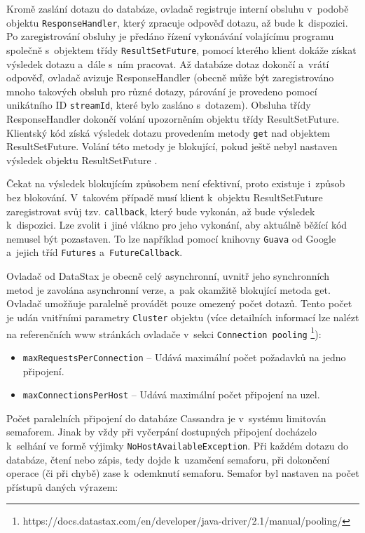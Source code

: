 \noindent Kromě zaslání dotazu do databáze, ovladač registruje interní obsluhu v~podobě objektu \texttt{ResponseHandler}, který zpracuje odpověď dotazu, až bude k~dispozici. Po zaregistrování obsluhy je předáno řízení vykonávání volajícímu programu společně s~objektem třídy \texttt{ResultSetFuture}, pomocí kterého klient dokáže získat výsledek dotazu a~dále s~ním pracovat.
Až databáze dotaz dokončí a~vrátí odpověď, ovladač avizuje ResponseHandler (obecně může být zaregistrováno mnoho takových obsluh pro různé dotazy, párování je provedeno pomocí unikátního ID \texttt{streamId}, které bylo zasláno s~dotazem). Obsluha třídy ResponseHandler dokončí volání upozorněním objektu třídy ResultSetFuture.
Klientský kód získá výsledek dotazu provedením metody \texttt{get} nad objektem ResultSetFuture. Volání této metody je blokující, pokud ještě nebyl nastaven výsledek objektu ResultSetFuture \cite{asyncQueriesCassandra}.

Čekat na výsledek blokujícím způsobem není efektivní, proto existuje i~způsob bez blokování. V~takovém případě musí klient k~objektu ResultSetFuture zaregistrovat svůj tzv. \texttt{callback}, který bude vykonán, až bude výsledek k~dispozici.
Lze zvolit i~jiné vlákno pro jeho vykonání, aby aktuálně běžící kód nemusel být pozastaven. To lze například pomocí knihovny \texttt{Guava} od Google a~jejich tříd \texttt{Futures} a~\texttt{FutureCallback}.

\noindent Ovladač od DataStax je obecně celý asynchronní, uvnitř jeho synchronních metod je zavolána asynchronní verze, a~pak okamžitě blokující metoda get. Ovladač umožňuje paralelně provádět pouze omezený počet dotazů. Tento počet je udán vnitřními parametry \texttt{Cluster} objektu (více detailních informací lze nalézt na referenčních www stránkách ovladače v~sekci \texttt{Connection pooling} \footnote{https://docs.datastax.com/en/developer/java-driver/2.1/manual/pooling/}):

\begin{itemize}
    \item \texttt{maxRequestsPerConnection} -- Udává maximální počet požadavků na jedno připojení.
    
    \item \texttt{maxConnectionsPerHost} -- Udává maximální počet připojení na uzel.
\end{itemize}

\noindent Počet paralelních připojení do databáze Cassandra je v~systému limitován semaforem. Jinak by vždy při vyčerpání dostupných připojení docházelo k~selhání ve formě výjimky \texttt{NoHostAvailableException}. Při každém dotazu do databáze, čtení nebo zápis, tedy dojde k~uzamčení semaforu, při dokončení operace (či při chybě) zase k~odemknutí semaforu. Semafor byl nastaven na počet přístupů daných výrazem:

